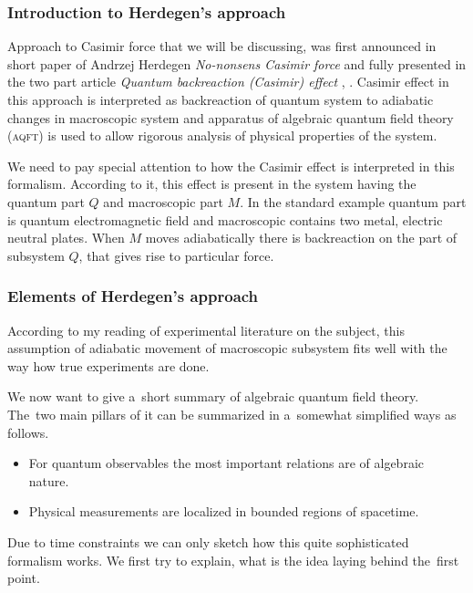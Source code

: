 \documentclass[10pt,t]{beamer}
\begin{document}
\begin{frame}
  \frametitle{Introduction to Herdegen's approach}


  Approach to Casimir force that we will be discussing, was first announced
  in short paper of Andrzej Herdegen \textit{No-nonsens Casimir force}
  \parencite{Herdegen-Nononsens-Casimir-force-Pub-2001} and fully presented
  in the two part article \textit{Quantum backreaction (Casimir) effect}
  \parencite{Herdegen-Quantum-backreaction-ETC-Part-I-Pub-2005},
  \parencite{Herdegen-Quantum-backreaction-ETC-Part-II-Pub-2006}. Casimir
  effect in this approach is interpreted as backreaction of quantum system
  to adiabatic changes in macroscopic system and apparatus of algebraic
  quantum field theory (\textsc{aqft}) is used to allow rigorous analysis
  of physical properties of the system.

  We need to pay special attention to how the Casimir effect is interpreted
  in this formalism. According to it, this effect is present in the system
  having the quantum part $Q$ and macroscopic part $M$. In the standard
  example quantum part is quantum electromagnetic field and macroscopic
  contains two metal, electric neutral plates. When $M$ moves
  \alert{adiabatically} there is backreaction on the part of subsystem $Q$,
  that gives rise to particular force.

\end{frame}





\begin{frame}
  \frametitle{Elements of Herdegen's approach}


  According to my reading of experimental literature on the subject,
  this assumption of adiabatic movement of macroscopic subsystem fits
  well with the way how true experiments are done.

  We now want to give a~short summary of algebraic quantum field theory.
  The~two main pillars of it can be summarized in a~somewhat simplified
  ways as follows.
  \begin{itemize}

  \item For quantum observables the most important relations are of
    algebraic nature.

  \item Physical measurements are localized in bounded regions of
    spacetime.

  \end{itemize}
  Due to time constraints we can only sketch how this quite sophisticated
  formalism works. We first try to explain, what is the idea laying behind
  the~first point.

\end{frame}
\end{document}

